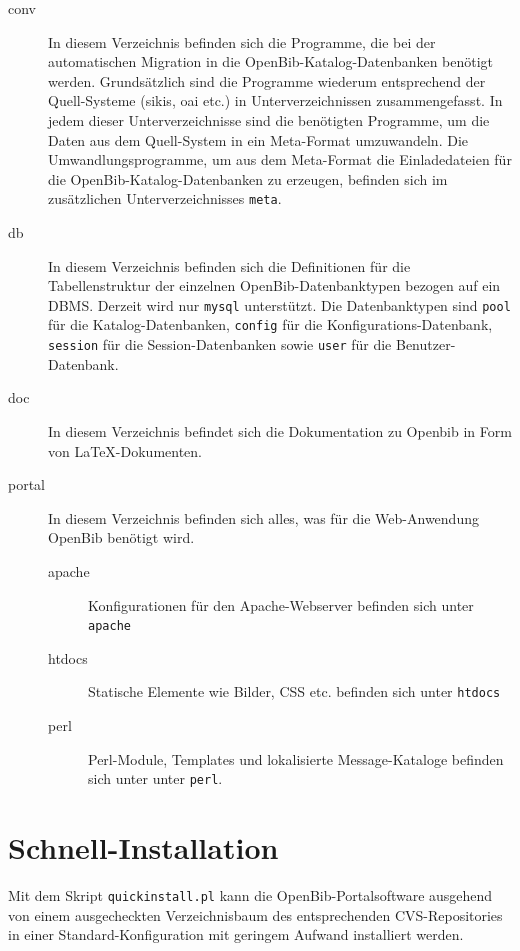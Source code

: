 \documentclass[11pt, twoside, a4paper, BCOR8mm, DIV12, bibtotoc,idxtotoc]{scrbook}
\begin{document}
\begin{description}
\item[conv] In diesem Verzeichnis befinden sich die Programme, die bei
  der automatischen Migration in die OpenBib-Katalog-Datenbanken
  benötigt werden. Grundsätzlich sind die Programme wiederum
  entsprechend der Quell-Systeme (sikis, oai etc.) in
  Unterverzeichnissen zusammengefasst. In jedem dieser
  Unterverzeichnisse sind die benötigten Programme, um die Daten aus
  dem Quell-System in ein Meta-Format umzuwandeln. Die
  Umwandlungsprogramme, um aus dem Meta-Format die Einladedateien für
  die OpenBib-Katalog-Datenbanken zu erzeugen, befinden sich im
  zusätzlichen Unterverzeichnisses \texttt{meta}.
\item[db] In diesem Verzeichnis befinden sich die Definitionen für die
  Tabellenstruktur der einzelnen OpenBib-Datenbanktypen bezogen auf
  ein DBMS. Derzeit wird nur \texttt{mysql} unterstützt. Die
  Datenbanktypen sind \texttt{pool} für die Katalog-Datenbanken,
  \texttt{config} für die Konfigurations-Datenbank, \texttt{session}
  für die Session-Datenbanken sowie \texttt{user} für die
  Benutzer-Datenbank.
\item[doc] In diesem Verzeichnis befindet sich die Dokumentation zu
  Openbib in Form von LaTeX-Dokumenten.
\item[portal] In diesem Verzeichnis befinden sich alles, was für die
  Web-Anwendung OpenBib benötigt wird.
  \begin{description}
  \item[apache] Konfigurationen für den Apache-Webserver befinden sich
    unter \texttt{apache}
  \item[htdocs] Statische Elemente wie Bilder, CSS etc. befinden sich unter \texttt{htdocs}
  \item[perl] Perl-Module, Templates und lokalisierte Message-Kataloge
    befinden sich unter unter \texttt{perl}.
  \end{description}
\end{description}

\chapter{Schnell-Installation}

Mit dem Skript \texttt{quickinstall.pl} kann die OpenBib-Portalsoftware
ausgehend von einem ausgecheckten Verzeichnisbaum des entsprechenden
CVS-Repositories in einer Standard-Konfiguration mit geringem Aufwand
installiert werden.
\end{document}
